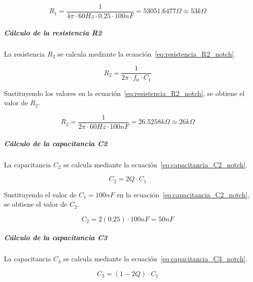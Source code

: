                     \begin{equation}
                        R_1 = \frac{1}{4\pi \cdot 60 Hz \cdot 0.25 \cdot 100 nF} = 53051.6477 \Omega \approx 53 k\Omega
                    \end{equation}

                \subparagraph{Cálculo de la resistencia R2}
                    La resistencia $R_2$ se calcula mediante la ecuación~\ref{eq:resistencia_R2_notch}.

                    \begin{equation}
                        \label{eq:resistencia_R2_notch}
                        R_2 = \frac{1}{2\pi \cdot f_0 \cdot C_1}
                    \end{equation}

                    Sustituyendo los valores en la ecuación~\ref{eq:resistencia_R2_notch}, se obtiene el valor de $R_2$.

                    \begin{equation}
                        R_2 = \frac{1}{2\pi \cdot 60 Hz \cdot 100 nF} = 26.5258 k\Omega \approx 26 k\Omega
                    \end{equation}

                \subparagraph{Cálculo de la capacitancia C2}
                    La capacitancia $C_2$ se calcula mediante la ecuación~\ref{eq:capacitancia_C2_notch}.

                    \begin{equation}
                        \label{eq:capacitancia_C2_notch}
                        C_2 = 2Q \cdot C_1
                    \end{equation}

                    Sustituyendo el valor de $C_1 = 100 nF$ en la ecuación~\ref{eq:capacitancia_C2_notch}, se obtiene el valor de $C_2$.

                    \begin{equation}
                        C_2 = 2(0.25) \cdot 100 nF = 50 nF
                    \end{equation}

                \subparagraph{Cálculo de la capacitancia C3}
                    La capacitancia $C_3$ se calcula mediante la ecuación~\ref{eq:capacitancia_C3_notch}.

                    \begin{equation}
                        \label{eq:capacitancia_C3_notch}
                        C_3 = (1 - 2Q) \cdot C_1
                    \end{equation}


